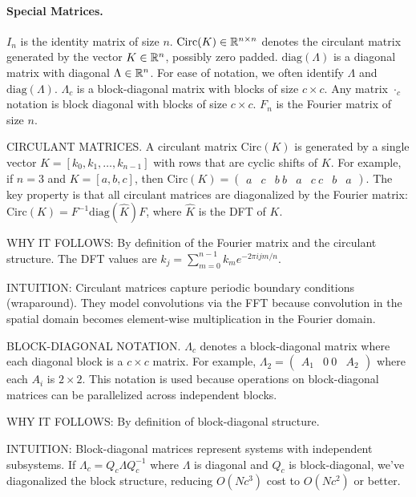 \documentclass{article}
\begin{document}
\paragraph{Special Matrices.} $I_n$ is the identity matrix of size $n$. $\mathrm{Circ}(K) \in \mathbb{R}^{n \times n}$ denotes the circulant matrix generated by the vector $K \in \mathbb{R}^n$, possibly zero padded. $\mathrm{diag}(\Lambda)$ is a diagonal matrix with diagonal $\Lambda \in \mathbb{R}^n$. For ease of notation, we often identify $\Lambda$ and $\mathrm{diag}(\Lambda)$. $\Lambda_c$ is a block-diagonal matrix with blocks of size $c \!\times\! c$. Any matrix $\cdot_c$ notation is block diagonal with blocks of size $c \!\times\! c$. $F_n$ is the Fourier matrix of size $n$.

\begin{thomasbox}
CIRCULANT MATRICES. A circulant matrix $\mathrm{Circ}(K)$ is generated by a single vector $K = [k_0, k_1, \ldots, k_{n-1}]$ with rows that are cyclic shifts of $K$. For example, if $n=3$ and $K = [a, b, c]$, then $\mathrm{Circ}(K) = \begin{pmatrix} a & c & b \ b & a & c \ c & b & a \end{pmatrix}$. The key property is that all circulant matrices are diagonalized by the Fourier matrix: $\mathrm{Circ}(K) = F^{-1} \mathrm{diag}(\hat{K}) F$, where $\hat{K}$ is the DFT of $K$.

WHY IT FOLLOWS: By definition of the Fourier matrix and the circulant structure. The DFT values are $\hat{k}_j = \sum_{m=0}^{n-1} k_m e^{-2\pi i jm/n}$.

INTUITION: Circulant matrices capture periodic boundary conditions (wraparound). They model convolutions via the FFT because convolution in the spatial domain becomes element-wise multiplication in the Fourier domain.
\end{thomasbox}

\begin{thomasbox}
BLOCK-DIAGONAL NOTATION. $\Lambda_c$ denotes a block-diagonal matrix where each diagonal block is a $c \times c$ matrix. For example, $\Lambda_2 = \begin{pmatrix} A_1 & 0 \ 0 & A_2 \end{pmatrix}$ where each $A_i$ is $2 \times 2$. This notation is used because operations on block-diagonal matrices can be parallelized across independent blocks.

WHY IT FOLLOWS: By definition of block-diagonal structure.

INTUITION: Block-diagonal matrices represent systems with independent subsystems. If $\Lambda_c = Q_c \Lambda Q_c^{-1}$ where $\Lambda$ is diagonal and $Q_c$ is block-diagonal, we've diagonalized the block structure, reducing $O(N c^3)$ cost to $O(N c^2)$ or better.
\end{thomasbox}
\end{document}
